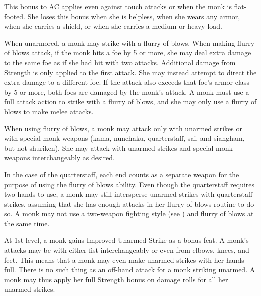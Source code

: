 \par This bonus to AC applies even against touch attacks or when the monk is flat-footed. She loses this bonus when she is helpless, when she wears any armor, when she carries a shield, or when she carries a medium or heavy load.

\begin{comment}    %
 \cfnl{\Ki Ward (Ex)}\label{Mnk:Ki Ward (Ex)} When unarmored and unencumbered, a monk gains a \plus1 armor bonus to AC at 2nd level. This bonus increases by 1 for every two monk levels thereafter (\plus2 at 4th, \plus3 at 6th, etc.).

\par The monk loses this bonus when she is
immobilized or helpless, when she wears any armor, when she carries a shield, or when she carries a medium or heavy load.
\end{comment}

   When unarmored, a monk may strike with a flurry of blows. When making flurry of blows attack, if the monk hits a foe by 5 or more, she may deal extra damage to the same foe as if she had hit with two attacks. Additional damage from Strength is only applied to the first attack. She may instead attempt to direct the extra damage to a different foe. If the attack also exceeds that foe's armor class by 5 or more, both foes are damaged by the monk's attack. A monk must use a full attack action to strike with a flurry of blows, and she may only use a flurry of blows to make melee attacks.

\par When using flurry of blows, a monk may attack only with unarmed strikes or with special monk weapons (kama, nunchaku, quarterstaff, sai, and siangham, but not shuriken). She may attack with unarmed strikes and special monk weapons interchangeably as desired.

In the case of the quarterstaff, each end counts as a separate weapon for the purpose of using the flurry of blows ability. Even though the quarterstaff requires two hands to use, a monk may still intersperse unarmed strikes with quarterstaff strikes, assuming that she has enough attacks in her flurry of blows routine to do so. A monk may not use a two-weapon fighting style (see ) and flurry of blows at the same time.

 At 1st level, a monk gains Improved Unarmed Strike as a bonus feat. A monk's attacks may be with either fist interchangeably or even from elbows, knees, and feet. This means that a monk may even make unarmed strikes with her hands full. There is no such thing as an off-hand attack for a monk striking unarmed. A monk may thus apply her full Strength bonus on damage rolls for all her unarmed strikes.

